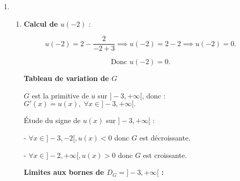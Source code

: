 \documentclass[12pt,a4paper]{article}
\begin{document}
\begin{enumerate}
\begin{enumerate}
    \[
    \text{Donc } \lim_{x \to +\infty} u(x) = 2
    \]

    \item \textbf{La primitive \( G \) de \( u \) telle que \( G(-2) = 0 \)} :
    
    \[
    u(x) = 2 - \frac{2}{x+3} \quad \text{donc} \quad G(x) = 2x - 2\ln(x+3) + k, \; \text{avec } k \in \mathbb{R}.
    \]

    \begin{align*}
    G(-2) &= 2(-2) - 2\ln(-2+3) + k \\
    &= -4 - 2\ln(1) + k \\
    &= -4 + k.
    \end{align*}

       Or \( G(-2) = 0 \) :
    \[
    -4 + k = 0 \quad \implies \quad k = 4.
    \]

    Donc :
    \[
    G(x) = 2x - 2\ln(x+3) + 4.
    \]
\end{enumerate}

\item
\begin{enumerate}
    \item \textbf{Calcul de \( u(-2) \)} :

    \[
    u(-2) = 2 - \frac{2}{-2+3} \implies u(-2) = 2 - 2 \implies u(-2) = 0.
    \]

    \[
    \text{Donc } u(-2) = 0.
    \]
    
    \textbf{Tableau de variation de \( G \)}

\( G \) est la primitive de \( u \) sur \( ]-3, +\infty[ \), donc :$ G'(x) = u(x), \; \forall x \in ]-3, +\infty[. $

Étude du signe de \( u(x) \) sur \( ]-3, +\infty[ \) :

\begin{center}


\end{center}

- \( \forall x \in ]-3, -2[, u(x) < 0 \) donc \( G \) est décroissante.

- \( \forall x \in ]-2, +\infty[, u(x) > 0 \) donc \( G \) est croissante.

\textbf{Limites aux bornes de \( D_G = ]-3, +\infty[ \) :}


\end{enumerate}
\end{enumerate}
\end{document}

